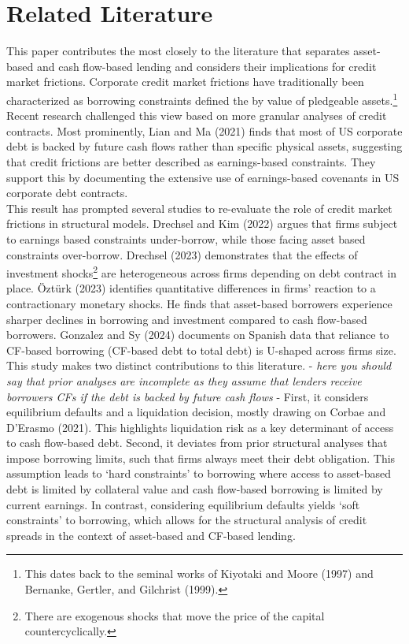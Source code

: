 \documentclass[12pt]{article}
\begin{document}
\section{Related Literature \label{sec:literature}} 
This paper contributes the most closely to the literature that separates asset-based and cash flow-based lending and considers their implications for credit market frictions. Corporate credit market frictions have traditionally been characterized as borrowing constraints defined the by value of pledgeable assets.\footnote{This dates back to the seminal works of Kiyotaki and Moore (1997) and Bernanke, Gertler, and Gilchrist (1999).} Recent research challenged this view based on more granular analyses of credit contracts. Most prominently, Lian and Ma (2021) finds that most of US corporate debt is backed by future cash flows rather than specific physical assets, suggesting that credit frictions are better described as earnings-based constraints. They support this by documenting the extensive use of earnings-based covenants in US corporate debt contracts. \vspace{3mm} \\
This result has prompted several studies to re-evaluate the role of credit market frictions in structural models. Drechsel and Kim (2022) argues that firms subject to earnings based constraints under-borrow, while those facing asset based constraints over-borrow. Drechsel (2023) demonstrates that the effects of investment shocks\footnote{There are exogenous shocks that move the price of the capital countercyclically.} are heterogeneous across firms depending on debt contract in place. Öztürk (2023) identifies quantitative differences in firms' reaction to a contractionary monetary shocks. He finds that asset-based borrowers experience sharper declines in borrowing and investment compared to cash flow-based borrowers. Gonzalez and Sy (2024) documents on Spanish data that reliance to CF-based borrowing (CF-based debt to total debt) is U-shaped across firms size. \vspace{3mm} \\
This study makes two distinct contributions to this literature. - \textit{here you should say that prior analyses are incomplete as they assume that lenders receive borrowers CFs if the debt is backed by future cash flows} - First, it considers equilibrium defaults and a liquidation decision, mostly drawing on Corbae and D'Erasmo (2021). This highlights liquidation risk as a key determinant of access to cash flow-based debt. Second, it deviates from prior structural analyses that impose borrowing limits, such that firms always meet their debt obligation. This assumption leads to `hard constraints' to borrowing where access to asset-based debt is limited by collateral value and cash flow-based borrowing is limited by current earnings. In contrast, considering equilibrium defaults yields `soft constraints' to borrowing, which  allows for the structural analysis of credit spreads in the context of asset-based and CF-based lending. \vspace{3mm} \\
\end{document}
